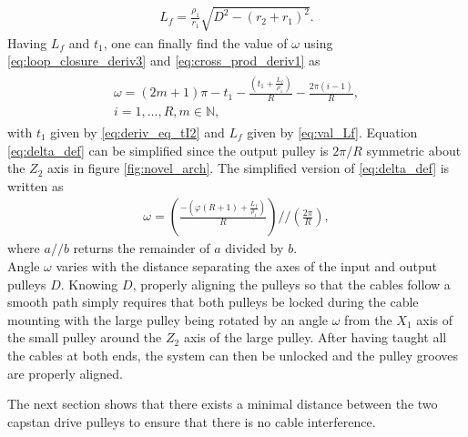 \documentclass[10pt,cleanfoot]{asme2ej}
\begin{document}
\begin{align}
L_f = \frac{\rho_1}{r_1}\sqrt{D^2-(r_2+r_1)^2}.
\label{eq:val_Lf}
\end{align}
Having $L_f$ and $t_1$, one can finally find the value of $\omega$ using \eqref{eq:loop_closure_deriv3} and \eqref{eq:cross_prod_deriv1} as 
\begin{align}
\begin{multlined}
\omega = \left(2m+1\right)\pi-t_1-\frac{\left(t_1+\frac{L_f}{\rho_1}\right)}{R}-\frac{2\pi(i-1)}{R},\\ i=1 ,\ldots , R, m \in \mathbb{N},
\label{eq:delta_def}
\end{multlined}
\end{align}
with $t_1$ given by \eqref{eq:deriv_eq_tI2} and $L_f$ given by \eqref{eq:val_Lf}. Equation \eqref{eq:delta_def} can be simplified since the output pulley is $2\pi/R$ symmetric about the $Z_2$ axis in figure \ref{fig:novel_arch}. The simplified version of \eqref{eq:delta_def} is written as
\begin{align}
\omega = \left(\frac{-\left(\varphi\left(R+1\right)+\frac{L_f}{\rho_1}\right)}{R}\right)//\left(\frac{2\pi}{R}\right),
\end{align}
where $a//b$ returns the remainder of $a$ divided by $b$.\\

Angle $\omega$ varies with the distance separating the axes of the input and output pulleys $D$. Knowing $D$, properly aligning the pulleys so that the cables follow a smooth path simply requires that both pulleys be locked during the cable mounting with the large pulley being rotated by an angle $\omega$ from the $X_1$ axis of the small pulley around the $Z_2$ axis of the large pulley. After having taught all the cables at both ends, the system can then be unlocked and the pulley grooves are properly aligned.\par
The next section shows that there exists a minimal distance between the two capstan drive pulleys to ensure that there is no cable interference.
\end{document}
